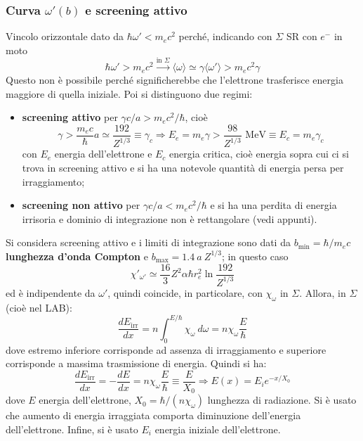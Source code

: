 \documentclass[10pt, a4paper]{scrartcl}
\numberwithin{equation}{subsection}
\theoremstyle{style1}
\begin{document}
\subsubsection{Curva $\omega'(b)$ e screening attivo}
Vincolo orizzontale dato da $\hbar \omega ' < m_ec^2$ perch\'e, indicando con $\Sigma$ SR con $e^-$ in moto
\[
	\hbar  \omega ' > m_e c^2 \stackrel{\text{in } \Sigma}{\longrightarrow} \langle \omega \rangle \simeq \gamma \langle \omega' \rangle > m_e c^2 \gamma
\] 
Questo non \`e possibile perch\'e significherebbe che l'elettrone trasferisce energia maggiore di quella iniziale. Poi si distinguono due regimi:
\begin{itemize}
	\item \textbf{screening attivo} per $\gamma c / a > m_e c^2 / \hbar $, cio\`e
		\[
		\gamma > \frac{m_e c}{\hbar } a \simeq \frac{192}{Z^{1 / 3} }\equiv \gamma_c \Rightarrow E_e = m_e \gamma > \frac{98}{Z^{1 / 3} } \text{ MeV} \equiv E_c = m_e \gamma_c
		\] 
	con $E_e$ energia dell'elettrone e $E_c$ energia critica, cio\`e energia sopra cui ci si trova in screening attivo e si ha una notevole quantit\`a di energia persa per irraggiamento;
\item \textbf{screening non attivo} per $ \gamma c / a < m_e c^2 / \hbar $ e si ha una perdita di energia irrisoria e dominio di integrazione non \`e rettangolare (vedi appunti).
\end{itemize}
Si considera screening attivo e i limiti di integrazione sono dati da $b_\text{min} = \hbar  / m_e c$ \textbf{lunghezza d'onda Compton} e $b_\text{max} = 1.4 \ a\ Z^{1 / 3} $; in questo caso
\begin{equation}
	\chi '_{\omega '} \simeq \frac{16}{3} Z^2 \alpha  \hbar  r_e ^2 \ln \frac{192}{Z^{1 / 3} }
\end{equation}
ed \`e indipendente da $\omega'$, quindi coincide, in particolare, con $\chi _\omega$ in $\Sigma$. Allora, in $\Sigma$ (cio\`e nel LAB):
\begin{equation}
	\frac{d E_\text{irr}}{d x}  = n \int_{0} ^{E / \hbar } \chi _\omega \ d\omega = n \chi _\omega \frac{E}{\hbar }
\end{equation}
dove estremo inferiore corrisponde ad assenza di irraggiamento e superiore corrisponde a massima trasmissione di energia. Quindi si ha:
\begin{equation}
	\frac{d E_\text{irr}}{d x}  = -\frac{d E}{d x} = n \chi _\omega \frac{E}{\hbar }\equiv \frac{E}{X_0} \Rightarrow E(x) = E_i e^{-x / X_0} 
\end{equation}
dove $E$ energia dell'elettrone, $X_0= \hbar  / (n\chi _\omega)$ lunghezza di radiazione. Si \`e usato che aumento di energia irraggiata comporta diminuzione dell'energia dell'elettrone. Infine, si \`e usato $E_i$ energia iniziale dell'elettrone.
\end{document}
